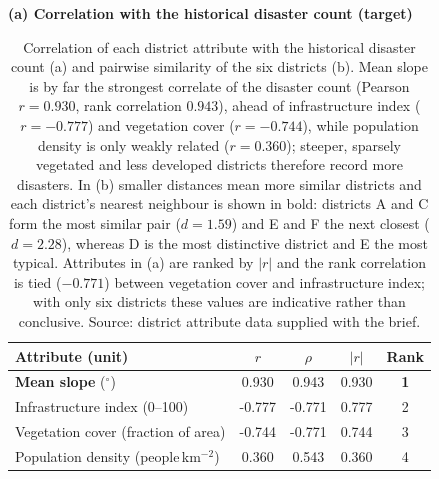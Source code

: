 \begin{table}[htbp]
  \centering
  \small
  \caption{Correlation of each district attribute with the historical disaster
  count (a) and pairwise similarity of the six districts (b). Mean slope is by far
  the strongest correlate of the disaster count (Pearson $r = 0.930$, rank
  correlation $0.943$), ahead of infrastructure index ($r = -0.777$) and vegetation
  cover ($r = -0.744$), while population density is only weakly related
  ($r = 0.360$); steeper, sparsely vegetated and less developed districts therefore
  record more disasters. In (b) smaller distances mean more similar districts and
  each district's nearest neighbour is shown in bold: districts A and C form the
  most similar pair ($d = 1.59$) and E and F the next closest ($d = 2.28$), whereas
  D is the most distinctive district and E the most typical. Attributes in (a) are
  ranked by $|r|$ and the rank correlation is tied ($-0.771$) between vegetation
  cover and infrastructure index; with only six districts these values are
  indicative rather than conclusive. Source: district attribute data supplied with
  the brief.}
  \label{tab:disaster-drivers}

  \textbf{(a) Correlation with the historical disaster count (target)}\\[0.4em]
  \begin{tabular}{@{}l S[table-format=-1.3] S[table-format=-1.3] S[table-format=1.3] c@{}}
    \toprule
    Attribute (unit)                        & {$r$}  & {$\rho$} & {$|r|$} & {Rank} \\
    \midrule
    \textbf{Mean slope} ($^\circ$)          & 0.930  & 0.943    & 0.930  & \textbf{1} \\
    Infrastructure index (0--100)           & -0.777 & -0.771   & 0.777  & 2 \\
    Vegetation cover (fraction of area)     & -0.744 & -0.771   & 0.744  & 3 \\
    Population density (people\,km$^{-2}$)  & 0.360  & 0.543    & 0.360  & 4 \\
    \bottomrule
  \end{tabular}


\end{table}
